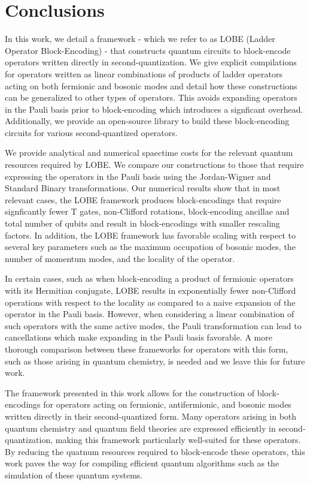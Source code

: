 \section{Conclusions}
\label{sec:conclusions}

In this work, we detail a framework - which we refer to as LOBE (Ladder Operator Block-Encoding) - that constructs quantum circuits to block-encode operators written directly in second-quantization.
We give explicit compilations for operators written as linear combinations of products of ladder operators acting on both fermionic and bosonic modes and detail how these constructions can be generalized to other types of operators.
This avoids expanding operators in the Pauli basis prior to block-encoding which introduces a signficant overhead.
Additionally, we provide an open-source library to build these block-encoding circuits for various second-quantized operators.

We provide analytical and numerical spaectime costs for the relevant quantum resources required by LOBE.
We compare our constructions to those that require expressing the operators in the Pauli basis using the Jordan-Wigner and Standard Binary transformations.
Our numerical results show that in most relevant cases, the LOBE framework produces block-encodings that require signficantly fewer T gates, non-Clifford rotations, block-encoding ancillae and total number of qubits and result in block-encodings with smaller rescaling factors.
In addition, the LOBE framework has favorable scaling with respect to several key parameters such as the maximum occupation of bosonic modes, the number of momentum modes, and the locality of the operator.

In certain cases, such as when block-encoding a product of fermionic operators with its Hermitian conjugate, LOBE results in exponentially fewer non-Clifford operations with respect to the locality as compared to a naive expansion of the operator in the Pauli basis.
However, when considering a linear combination of such operators with the same active modes, the Pauli transformation can lead to cancellations which make expanding in the Pauli basis favorable.
A more thorough comparison between these frameworks for operators with this form, such as those arising in quantum chemistry, is needed and we leave this for future work.

The framework presented in this work allows for the construction of block-encodings for operators acting on fermionic, antifermionic, and bosonic modes written directly in their second-quantized form.
Many operators arising in both quantum chemistry and quantum field theories are expressed efficiently in second-quantization, making this framework particularly well-suited for these operators.
By reducing the quatnum resources required to block-encode these operators, this work paves the way for compiling efficient quantum algorithms such as the simulation of these quantum systems.


